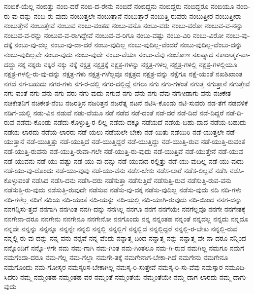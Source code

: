 {ನಂಬಿಕೆ-ಯೆಲ್ಲ
ನಂಬಿತ್ತು
ನಂಬಿ-ದರೆ
ನಂಬಿ-ದ-ರೇನು
ನಂಬಿದೆ
ನಂಬಿದ್ದನು
ನಂಬಿದ್ದರು
ನಂಬಿದ್ದರೂ
ನಂಬಿಯೂ
ನಂಬಿ-ರು-ವು-ದನ್ನು
ನಂಬಿ-ರು-ವುದು
ನಂಬುತ್ತಲೇ
ನಂಬುತ್ತಾನೆ
ನಂಬುತ್ತಾರೆ
ನಂಬುತ್ತಿ-ರುವರು
ನಂಬುತ್ತೀರ
ನಂಬುತ್ತೀರಾ
ನಂಬುತ್ತೇನೆ
ನಂಬುತ್ತೇವೆ
ನಂಬುವ
ನಂಬು-ವಂತಹ
ನಂಬು-ವನೊ
ನಂಬು-ವರು
ನಂಬು-ವರೋ
ನಂಬುವ-ವ-ನನ್ನು
ನಂಬುವ-ವ-ರನ್ನು
ನಂಬುವ-ವ-ರಾಗಿದ್ದೇವೆ
ನಂಬುವ-ವ-ರಿಗೂ
ನಂಬು-ವಷ್ಟು
ನಂಬು-ವಿರಿ
ನಂಬು-ವಿರೋ
ನಂಬು-ವು-ದಕ್ಕೆ
ನಂಬು-ವು-ದಲ್ಲ
ನಂಬು-ವು-ದಾ-ದರೆ
ನಂಬು-ವುದಿಲ್ಲ
ನಂಬು-ವುದಿಲ್ಲ-ವೆಂದರೆ
ನಂಬು-ವುದಿಲ್ಲ-ವೆಂಬು-ದನ್ನು
ನಂಬು-ವುದಿಲ್ಲವೇ
ನಂಬು-ವುದು
ನಂಬು-ವುದೇ
ನಂಬು-ವೆಯಾ
ನಂಬು-ವೆವು
ನಂಬೋಣ
ನಏಷ್ಯಾದ
ನಕಾರಾತ್ಮಕ-ವಾ-ದದ್ದು
ನಕ್ಕ
ನಕ್ಕರು
ನಕ್ಕರೆ
ನಕ್ಕು
ನಕ್ಕೆ
ನಕ್ಷತ್ರ
ನಕ್ಷತ್ರಕ್ಕೆ
ನಕ್ಷತ್ರ-ಗಳನ್ನು
ನಕ್ಷತ್ರ-ಗಳಲ್ಲ
ನಕ್ಷತ್ರ-ಗಳಲ್ಲಿ
ನಕ್ಷತ್ರ-ಗಳಲ್ಲಿಯೂ
ನಕ್ಷತ್ರ-ಗಳಲ್ಲಿ-ರು-ವು-ದನ್ನು
ನಕ್ಷತ್ರ-ಗಳು
ನಕ್ಷತ್ರ-ಗಳೆಲ್ಲವೂ
ನಕ್ಷತ್ರದ
ನಕ್ಷತ್ರ-ವನ್ನು
ನಕ್ಷೆಗೂ
ನಕ್ಷೆ-ಯಂತೆ
ನಖಶಿಖಾಂತ
ನಗದೆ
ನಗ-ಬಹುದು
ನಗರ-ಗಳು
ನಗ-ರ-ದಲ್ಲಿ
ನಗರ-ದಲ್ಲಿದ್ದೆ
ನಗಲು
ನಗು
ನಗು-ಗಳಂತೆ
ನಗುತ್ತ
ನಗುತ್ತಾನೆ
ನಗುತ್ತೇವೆ
ನಗು-ವಂತೆ
ನಗು-ವನು
ನಗು-ವರು
ನಗು-ವುದು
ನಗುವೆ
ನಗು-ವೆನು
ನಗು-ವೆವು
ನಗೆಗೀಡಾಗು-ವನು
ನಚಿಕೇತ
ನಚಿಕೇತನಿಗೆ
ನಚಿಕೇತ-ನೆಂಬ
ನಜರತ್ತಿನ
ನಜರಿತ್ತನ
ನಜರೆತ್ನ
ನಟನೆ
ನಟಿಸಿ-ಕೊಂಡು
ನಟಿ-ಸುವರು
ನಡ-ತೆಗೆ
ನಡವಳಿಕೆ
ನಡಿಗೆ-ಯಲ್ಲಿ
ನಡು-ವಿನ
ನಡುವೆ
ನಡು-ವೆಯೂ
ನಡೆ
ನಡೆದ
ನಡೆ-ದಂತೆ
ನಡೆ-ದರೆ
ನಡೆ-ದಿದೆ
ನಡೆ-ದಿದ್ದರೆ
ನಡೆ-ದಿ-ರುವ
ನಡೆದು-ಕೊಂಡು
ನಡೆದು-ಕೊಳ್ಳುತ್ತಿ-ರ-ಲಿಲ್ಲ
ನಡೆದು-ದಕ್ಕೂ
ನಡೆಯದೆ
ನಡೆಯ-ಬಹು-ದಾದ
ನಡೆಯ-ಬಹುದು
ನಡೆಯ-ಲಾರದು
ನಡೆಯ-ಲಾರರು
ನಡೆ-ಯಲು
ನಡೆಯಲೇ-ಬೇಕು
ನಡೆ-ಯಿತು
ನಡೆಯಿರಿ
ನಡೆ-ಯುತ್ತಲೇ
ನಡೆ-ಯುತ್ತಾನೆ
ನಡೆ-ಯುತ್ತಿತ್ತು
ನಡೆ-ಯುತ್ತಿದೆ
ನಡೆ-ಯುತ್ತಿದ್ದರೆ
ನಡೆ-ಯುತ್ತಿದ್ದು
ನಡೆ-ಯುತ್ತಿ-ರುವ
ನಡೆ-ಯುತ್ತಿ-ರುವಂತೆ
ನಡೆ-ಯುತ್ತಿ-ರುವನು
ನಡೆ-ಯುತ್ತಿ-ರುವಾ-ಗಲೇ
ನಡೆ-ಯುತ್ತಿ-ರು-ವುದು
ನಡೆ-ಯುತ್ತಿವೆ
ನಡೆ-ಯುತ್ತೇನೆ
ನಡೆ-ಯುವ
ನಡೆ-ಯುವನು
ನಡೆ-ಯು-ವಷ್ಟು
ನಡೆ-ಯು-ವು-ದನ್ನು
ನಡೆ-ಯುವುದ-ರಲ್ಲಿತ್ತು
ನಡೆ-ಯು-ವುದಿಲ್ಲ
ನಡೆ-ಯು-ವುದು
ನಡೆ-ಯು-ವು-ದೊಂದು
ನಡೆ-ಯು-ವುವು
ನಡೆ-ಯು-ವೆನು
ನಡೆಸ-ಬೇಕು
ನಡೆಸ-ಲಾರೆ
ನಡೆಸ-ಲಿಲ್ಲವೆ
ನಡೆಸಿ
ನಡೆಸಿ-ಕೊಳ್ಳುವಂತೆ
ನಡೆಸಿದ
ನಡೆಸಿ-ದನು
ನಡೆಸಿ-ದರು
ನಡೆಸುತ್ತಾ
ನಡೆಸುತ್ತಿದೆ
ನಡೆಸುತ್ತಿ-ರುವ
ನಡೆಸುತ್ತಿ-ರುವ-ವನು
ನಡೆಸುತ್ತಿ-ರು-ವುದು
ನಡೆಸುತ್ತಿ-ರುವುದೇ
ನಡೆಸುವ
ನಡೆಸು-ವು-ದಕ್ಕೆ
ನಡೆಸು-ವುದಿಲ್ಲ
ನಡೆಸು-ವುದು
ನದಿ
ನದಿ-ಗಳು
ನದಿ-ಗಳೆಲ್ಲ
ನದಿಗೆ
ನದಿಯ
ನದಿ-ಯಂತೆ
ನದಿ-ಯನ್ನು
ನದಿ-ಯಲ್ಲಿ
ನದಿ-ಯಾಗಿ-ರುವುದು
ನದಿ-ಯಿಂದ
ನನಗ-ದನ್ನು
ನನಗನ್ನಿಸು-ತ್ತದೆ
ನನಗಾಗಿ
ನನಗಿಂತ
ನನಗಿ-ದನ್ನು
ನನಗಿಲ್ಲ
ನನಗೂ
ನನಗೆ
ನನಗೆಯೇ
ನನಗೆಲ್ಲವೂ
ನನಗೇ
ನನಗೇತಕ್ಕೆ
ನನಗೇನಾ-ದರೂ
ನನಗೇನು
ನನಗೇನೂ
ನನಗೇನೋ
ನನಗೊಂದು
ನನ್ನ
ನನ್ನಂತಹ
ನನ್ನಂತೆ
ನನ್ನದಲ್ಲ
ನನ್ನದು
ನನ್ನದೂ
ನನ್ನದೇ
ನನ್ನನ್ನು
ನನ್ನನ್ನೂ
ನನ್ನನ್ನೇ
ನನ್ನಲಿ
ನನ್ನಲ್ಲಿ
ನನ್ನಲ್ಲಿಗೆ
ನನ್ನಲ್ಲಿದೆ
ನನ್ನಲ್ಲಿದ್ದರೆ
ನನ್ನಲ್ಲಿ-ರ-ಬೇಕು
ನನ್ನಲ್ಲಿ-ರುವ
ನನ್ನಲ್ಲಿ-ರು-ವು-ದನ್ನು
ನನ್ನ-ವನು
ನನ್ನವೆ
ನನ್ನ-ವೆಂದು
ನನ್ನಾತ್ಮ-ದಿಂದ
ನನ್ನಾತ್ಮ-ನನ್ನು
ನನ್ನಾತ್ಮ-ವೇ-ನಾ-ದರೂ
ನನ್ನಿಂದ
ನನ್ನೊಂದಿಗೆ
ನನ್ನೊ-ಳಗೇ
ನಮ
ನಮ-ಗಾಗಿ
ನಮ-ಗಿಂತ
ನಮ-ಗಿಂತಲೂ
ನಮ-ಗಿ-ರುವ
ನಮಗಿಲ್ಲ
ನಮಗೂ
ನಮಗೆ
ನಮಗೆಂದಾ-ದರೂ
ನಮ-ಗೆಲ್ಲ
ನಮ-ಗೆಲ್ಲಾ
ನಮಗೇ-ತಕ್ಕೆ
ನಮಗೇನಾಗ-ಬೇಕಾ-ಗಿದೆ
ನಮಗೇನು
ನಮಗೇನೂ
ನಮಗೊಂದು
ನಮ-ಗೋಸ್ಕರ
ನಮಸ್ಕರಿಸ-ಬೇಕಾಗಿಲ್ಲ
ನಮಸ್ಕ-ರಿ-ಸುತ್ತೇವೆ
ನಮಸ್ಕ-ರಿ-ಸು-ವೆವು
ನಮಸ್ಕಾರ
ನಮೂದಿ-ಸಿದರು
ನಮ್ಮ
ನಮ್ಮಂತಹ
ನಮ್ಮಂತಹ-ವರ
ನಮ್ಮಂತೆ
ನಮ್ಮಂತೆಯೆ
ನಮ್ಮಂತೆಯೇ
ನಮ್ಮ-ದಾಗ-ಲಾರದು
ನಮ್ಮ-ದಾಗು-ವುದು
}
